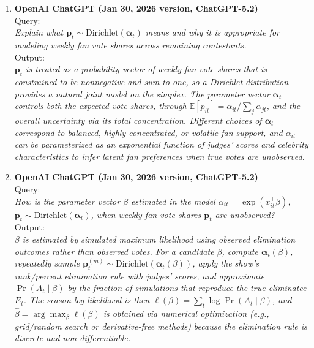 \documentclass[12pt]{article}
\begin{document}
\begin{enumerate}
	
	\item \textbf{OpenAI ChatGPT (Jan 30, 2026 version, ChatGPT-5.2)}\\
	Query: \\
	\textit{Explain what \(\mathbf{p}_t \sim \mathrm{Dirichlet}(\boldsymbol{\alpha}_t)\) means and why it is appropriate for modeling weekly fan vote shares across remaining contestants.}\\
	Output: \\
	\textit{\(\mathbf{p}_t\) is treated as a probability vector of weekly fan vote shares that is constrained to be nonnegative and sum to one, so a Dirichlet distribution provides a natural joint model on the simplex. The parameter vector \(\boldsymbol{\alpha}_t\) controls both the expected vote shares, through \(\mathbb{E}[p_{it}] = \alpha_{it}/\sum_j \alpha_{jt}\), and the overall uncertainty via its total concentration. Different choices of \(\boldsymbol{\alpha}_t\) correspond to balanced, highly concentrated, or volatile fan support, and \(\alpha_{it}\) can be parameterized as an exponential function of judges' scores and celebrity characteristics to infer latent fan preferences when true votes are unobserved.}
	
	
	\item \textbf{OpenAI ChatGPT (Jan 30, 2026 version, ChatGPT-5.2)}\\
	Query: \\
	\textit{How is the parameter vector \(\beta\) estimated in the model \(\alpha_{it}=\exp(x_{it}^\top\beta)\), \(\mathbf{p}_t\sim\mathrm{Dirichlet}(\boldsymbol{\alpha}_t)\), when weekly fan vote shares \(\mathbf{p}_t\) are unobserved?}\\
	Output: \\
	\textit{\(\beta\) is estimated by simulated maximum likelihood using observed elimination outcomes rather than observed votes. For a candidate \(\beta\), compute \(\boldsymbol{\alpha}_t(\beta)\), repeatedly sample \(\mathbf{p}_t^{(m)}\sim\mathrm{Dirichlet}(\boldsymbol{\alpha}_t(\beta))\), apply the show’s rank/percent elimination rule with judges’ scores, and approximate \(\Pr(A_t\mid\beta)\) by the fraction of simulations that reproduce the true eliminatee \(E_t\). The season log-likelihood is then \(\ell(\beta)=\sum_t \log \Pr(A_t\mid\beta)\), and \(\hat\beta=\arg\max_\beta \ell(\beta)\) is obtained via numerical optimization (e.g., grid/random search or derivative-free methods) because the elimination rule is discrete and non-differentiable.}
	

\end{enumerate}
\end{document}
